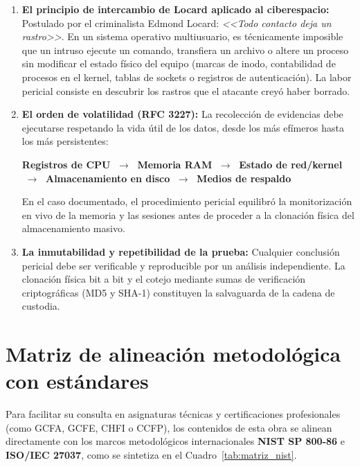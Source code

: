 \begin{enumerate}
    \item \textbf{El principio de intercambio de Locard aplicado al ciberespacio:}
    Postulado por el criminalista Edmond Locard: \textit{<<Todo contacto deja un rastro>>}. En un sistema operativo multiusuario, es técnicamente imposible que un intruso ejecute un comando, transfiera un archivo o altere un proceso sin modificar el estado físico del equipo (marcas de inodo, contabilidad de procesos en el kernel, tablas de sockets o registros de autenticación). La labor pericial consiste en descubrir los rastros que el atacante creyó haber borrado.
    
    \item \textbf{El orden de volatilidad (RFC 3227):}
    La recolección de evidencias debe ejecutarse respetando la vida útil de los datos, desde los más efímeros hasta los más persistentes:
    \begin{center}
    \small\sffamily
    \textbf{Registros de CPU} $\;\longrightarrow\;$ \textbf{Memoria RAM} $\;\longrightarrow\;$ \textbf{Estado de red/kernel}\\[4pt]
    $\;\longrightarrow\;$ \textbf{Almacenamiento en disco} $\;\longrightarrow\;$ \textbf{Medios de respaldo}
    \end{center}
    En el caso documentado, el procedimiento pericial equilibró la monitorización en vivo de la memoria y las sesiones antes de proceder a la clonación física del almacenamiento masivo.

    \item \textbf{La inmutabilidad y repetibilidad de la prueba:}
    Cualquier conclusión pericial debe ser verificable y reproducible por un análisis independiente. La clonación física bit a bit y el cotejo mediante sumas de verificación criptográficas (MD5 y SHA-1) constituyen la salvaguarda de la cadena de custodia.
\end{enumerate}

\section*{Matriz de alineación metodológica con estándares}

Para facilitar su consulta en asignaturas técnicas y certificaciones profesionales (como GCFA, GCFE, CHFI o CCFP), los contenidos de esta obra se alinean directamente con los marcos metodológicos internacionales \textbf{NIST SP 800-86} e \textbf{ISO/IEC 27037}, como se sintetiza en el Cuadro~\ref{tab:matriz_nist}.

